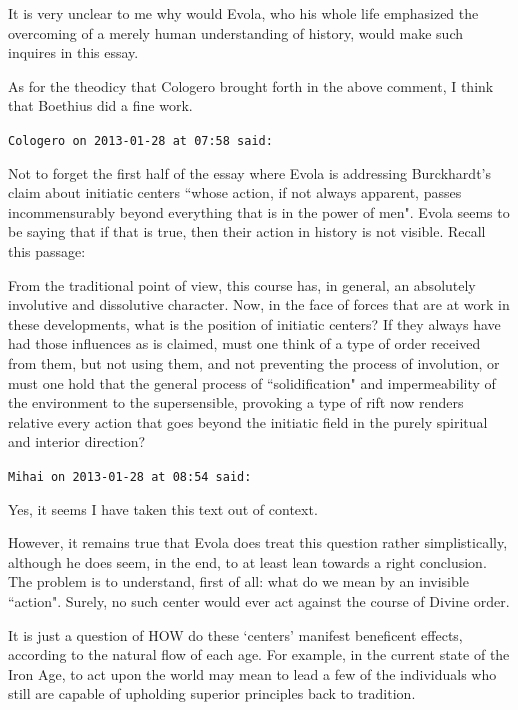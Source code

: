 \begin{footnotesize}
\begin{sffamily}
It is very unclear to me why would Evola, who his whole life emphasized the overcoming of a merely human understanding of history, would make such inquires in this essay. 

As for the theodicy that Cologero brought forth in the above comment, I think that Boethius did a fine work.


\hfill

\texttt{Cologero on 2013-01-28 at 07:58 said: }

Not to forget the first half of the essay where Evola is addressing Burckhardt's claim about initiatic centers ``whose action, if not always apparent, passes incommensurably beyond everything that is in the power of men". Evola seems to be saying that if that is true, then their action in history is not visible. Recall this passage:

\begin{quotex}
From the traditional point of view, this course has, in general, an absolutely involutive and dissolutive character. Now, in the face of forces that are at work in these developments, what is the position of initiatic centers? If they always have had those influences as is claimed, must one think of a type of order received from them, but not using them, and not preventing the process of involution, or must one hold that the general process of ``solidification" and impermeability of the environment to the supersensible, provoking a type of rift now renders relative every action that goes beyond the initiatic field in the purely spiritual and interior direction? 

\end{quotex}

\hfill

\texttt{Mihai on 2013-01-28 at 08:54 said: }

Yes, it seems I have taken this text out of context. 

However, it remains true that Evola does treat this question rather simplistically, although he does seem, in the end, to at least lean towards a right conclusion. The problem is to understand, first of all: what do we mean by an invisible ``action". Surely, no such center would ever act against the course of Divine order. 

It is just a question of HOW do these `centers' manifest beneficent effects, according to the natural flow of each age. For example, in the current state of the Iron Age, to act upon the world may mean to lead a few of the individuals who still are capable of upholding superior principles back to tradition. 


\end{sffamily}
\end{footnotesize}
